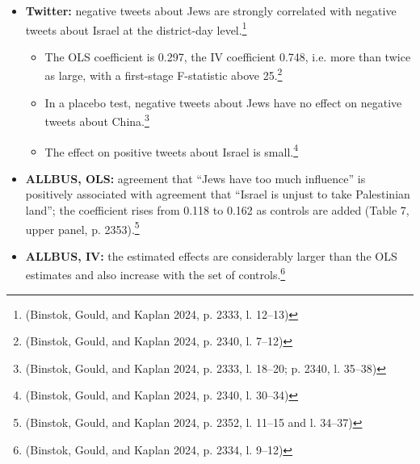 \begin{itemize}
\item
  \textbf{Twitter:} negative tweets about Jews are strongly correlated with negative tweets about Israel at the district-day level.\footnote{(Binstok, Gould, and Kaplan 2024, p. 2333, l. 12--13)}

  \begin{itemize}
  \item
    The OLS coefficient is 0.297, the IV coefficient 0.748, i.e. more than twice as large, with a first-stage F-statistic above 25.\footnote{(Binstok, Gould, and Kaplan 2024, p. 2340, l. 7--12)}
  \item
    In a placebo test, negative tweets about Jews have no effect on negative tweets about China.\footnote{(Binstok, Gould, and Kaplan 2024, p. 2333, l. 18--20; p. 2340, l. 35--38)}
  \item
    The effect on positive tweets about Israel is small.\footnote{(Binstok, Gould, and Kaplan 2024, p. 2340, l. 30--34)}
  \end{itemize}
\item
  \textbf{ALLBUS, OLS:} agreement that ``Jews have too much influence'' is positively associated with agreement that ``Israel is unjust to take Palestinian land''; the coefficient rises from 0.118 to 0.162 as controls are added (Table 7, upper panel, p. 2353).\footnote{(Binstok, Gould, and Kaplan 2024, p. 2352, l. 11--15 and l. 34--37)}
\item
  \textbf{ALLBUS, IV:} the estimated effects are considerably larger than the OLS estimates and also increase with the set of controls.\footnote{(Binstok, Gould, and Kaplan 2024, p. 2334, l. 9--12)}


\end{itemize}
